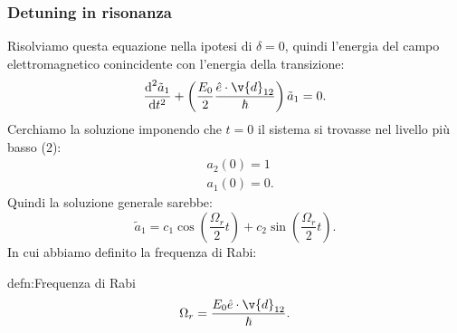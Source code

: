 \subsubsection{Detuning in risonanza}%
Risolviamo questa equazione nella ipotesi di $\delta =0$, quindi l'energia del campo elettromagnetico conincidente con l'energia della transizione:
\[
    \frac{\text{d}^2 \tilde{a}_1}{\text{d} t^2} 
    + \left(\frac{E_0}{2}\frac{\hat{e}\cdot \v{d}_{12}}{\hbar }\right)
    \tilde{a}_1=0
.\] 
Cerchiamo la soluzione imponendo che $t=0$ il sistema si trovasse nel livello più basso (2): 
\[\begin{aligned}
    &a_2(0) = 1\\
    &a_1(0) = 0
.\end{aligned}\]
Quindi la soluzione generale sarebbe:
\[
    \tilde{a}_1 = c_1 \cos\left(\frac{\Omega_r}{2}t\right) 
    + c_2 \sin\left(\frac{\Omega_r}{2}t\right)
.\] 
In cui abbiamo definito la frequenza di Rabi:
\begin{defn}{defn:Frequenza di Rabi}
\[
  \Omega_r = \frac{E_0 \hat{e}\cdot \v{d}_{12}}{\hbar }  
.\] 
\end{defn}

